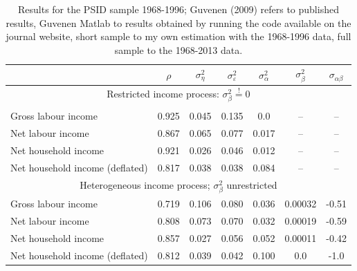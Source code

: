 \begin{table}%
\begin{tabular}{l|cccccc}
                     &$\rho$ & $\sigma^2_{\eta}$&$\sigma^2_{\varepsilon}$&$\sigma^2_{\alpha}$&$\sigma^2_{\beta}$&$\sigma_{\alpha \beta}$\\
\hline
\hline
\multicolumn{7}{c}{Restricted income process: $\sigma^2_{\beta} \stackrel{!}{=} 0$} \\
\hline \\
Gross labour income   & 0.925 &  0.045           &   0.135                &       0.0         &        --        &        --             \\
Net labour income     & 0.867 &  0.065           &   0.077                &       0.017       &        --        &        --             \\
Net household income  & 0.921 &  0.026           &   0.046                &       0.012       &        --        &        --             \\
Net household income (deflated) & 0.817 &  0.038 &   0.038                &       0.084       &        --        &        --             \\
\hline
\multicolumn{7}{c}{Heterogeneous income process; $\sigma^2_{\beta}$ unrestricted} \\
\hline
Gross labour income   & 0.719 &  0.106           &   0.080                &       0.036       &     0.00032      &       -0.51           \\
Net labour income     & 0.808 &  0.073           &   0.070                &       0.032       &     0.00019      &       -0.59           \\
Net household income  & 0.857 &  0.027           &   0.056                &       0.052       &     0.00011      &       -0.42           \\
Net household income (deflated) & 0.812 &  0.039 &   0.042                &       0.100       &        0.0       &       -1.0            \\
\hline
\end{tabular}
\caption{Results for the PSID sample 1968-1996; Guvenen (2009) refers to published results, Guvenen Matlab to results obtained by running
the code available on the journal website, short sample to my own estimation with the 1968-1996 data, full sample to the 1968-2013 data.}
\label{tab:BHPS_results}
\end{table}

